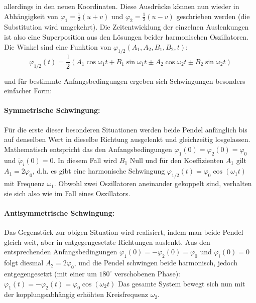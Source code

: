 allerdings in den neuen Koordinaten. Diese Ausdrücke können nun wieder in Abhängigkeit von \(\varphi_1 = \tfrac{1}{2}(u + v)\) und \(\varphi_2 = \tfrac{1}{2}(u - v)\) geschrieben werden (die Substitution wird umgekehrt). Die Zeitentwicklung der einzelnen Auslenkungen ist also eine Superposition aus den Lösungen beider harmonischen Oszillatoren. Die Winkel sind eine Funktion von \(\varphi_{1/2}(A_1,A_2,B_1,B_2,t)\):
\begin{equation}
    \varphi_{1/2}(t) = \frac{1}{2} (A_1 \cos \omega_1 t + B_1 \sin \omega_1 t \pm A_2 \cos \omega_2 t \pm B_2 \sin \omega_2 t)
    \label{eq:allgemeinphi}
\end{equation}

und für bestimmte Anfangsbedingungen ergeben sich Schwingungen besonders einfacher Form:
\newpage
\paragraph{Symmetrische Schwingung:}Für die erste dieser besonderen Situationen werden beide Pendel anfänglich bis auf denselben Wert in dieselbe Richtung ausgelenkt und gleichzeitig losgelassen. Mathematisch entspricht das den Anfangsbedingungen \(\varphi_1(0) = \varphi_2(0) = \varphi_0\) und \(\dot{\varphi}_i(0) = 0\).
In diesem Fall wird \(B_1\) Null und für den Koeffizienten \(A_1\) gilt \(A_1 = 2\varphi_0\), d.h. es gibt eine harmonische Schwingung \(\varphi_{1/2}(t)=\varphi_0\cos(\omega_1t)\) mit Frequenz \(\omega_1\). Obwohl zwei Oszillatoren aneinander gekoppelt sind, verhalten sie sich also wie im Fall eines Oszillators.
\paragraph{Antisymmetrische Schwingung:}
Das Gegenstück zur obigen Situation wird realisiert, indem man beide Pendel gleich weit, aber in entgegengesetzte Richtungen auslenkt. Aus den entsprechenden Anfangsbedingungen \(\varphi_1(0) = -\varphi_2(0) = \varphi_0\) und \(\dot{\varphi}_i(0) = 0\) folgt diesmal \(A_2 = 2\varphi_0\), und die Pendel schwingen beide harmonisch, jedoch entgegengesetzt (mit einer um \(180^\circ\) verschobenen Phase): \(\varphi_1(t)=-\varphi_2(t)=\varphi_0\cos(\omega_2t)\) Das gesamte System bewegt sich nun mit der kopplungsabhängig erhöhten Kreisfrequenz \(\omega_2\).

